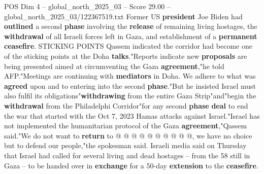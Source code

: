 \begin{textsample}{POS Dim 4 – global\_north\_2025\_03 – Score 29.00 – global\_north\_2025\_03/122367519.txt}
Former US \textbf{president} Joe Biden had \textbf{outlined} a second \textbf{phase} involving the \textbf{release} of remaining living hostages, the \textbf{withdrawal} of all Israeli forces left in Gaza, and establishment of a \textbf{permanent} \textbf{ceasefire}.
STICKING POINTS Qassem indicated the corridor had become one of the sticking points at the Doha \textbf{talks}."Reports indicate new \textbf{proposals} are being presented aimed at circumventing the Gaza \textbf{agreement},"he told AFP."Meetings are continuing with \textbf{mediators} in Doha.
We adhere to what was \textbf{agreed} upon and to entering into the second \textbf{phase}."But he insisted Israel must also fulfil its obligations"\textbf{withdrawing} from the entire Gaza Strip"and"begin the \textbf{withdrawal} from the Philadelphi Corridor"for any second \textbf{phase} \textbf{deal} to end the war that started with the Oct 7, 2023 Hamas attacks against Israel."Israel has not implemented the humanitarian protocol of the Gaza \textbf{agreement},"Qassem said."We do not want to \textbf{return} to @ @ @ @ @ @ @ @ @ @, we have no choice but to defend our people,"the spokesman said.
Israeli media said on Thursday that Israel had called for several living and dead hostages -- from the 58 still in Gaza -- to be handed over in \textbf{exchange} for a 50-day \textbf{extension} to the \textbf{ceasefire}.

\end{textsample}
